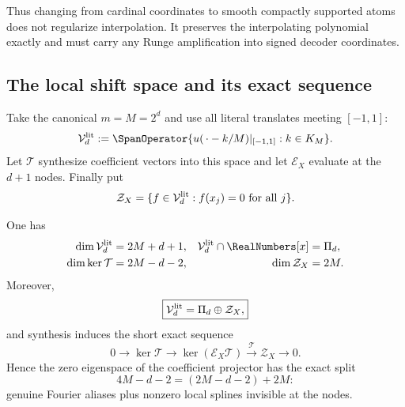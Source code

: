 Thus changing from cardinal coordinates to smooth compactly supported atoms
does not regularize interpolation.  It preserves the interpolating
polynomial exactly and must carry any Runge amplification into signed decoder
coordinates.

\subsection{The local shift space and its exact sequence}

Take the canonical $m=M=2^d$ and use all literal translates meeting
$[-1,1]$:
\[
 \mathcal V_d^{\rm lit}
 :=\SpanOperator\{u(\,\cdot-k/M)|_{[-1,1]}:k\in K_M\}.
\]
Let $\mathcal T$ synthesize coefficient vectors into this space and let
$\mathcal E_X$ evaluate at the $d+1$ nodes.  Finally put
\[
 \mathcal Z_X=\{f\in\mathcal V_d^{\rm lit}:f(x_j)=0\text{ for all }j\}.
\]

\begin{theorem}
\label{thm:lag-exact-sequence}
One has
\begin{align}
 \dim\mathcal V_d^{\rm lit}&=2M+d+1,
 &\mathcal V_d^{\rm lit}\cap\RealNumbers[x]&=\PiD,
 \label{eq:lag-lit-dimension}\\
 \dim\ker\mathcal T&=2M-d-2,
 &\dim\mathcal Z_X&=2M.
 \label{eq:lag-kernel-dimensions}
\end{align}
Moreover,
\begin{equation}
 \boxed{
 \mathcal V_d^{\rm lit}=\Pi_d\oplus\mathcal Z_X,}
 \label{eq:lag-direct-sum}
\end{equation}
and synthesis induces the short exact sequence
\begin{equation}
 0\longrightarrow\ker\mathcal T
 \longrightarrow\ker(\mathcal E_X\mathcal T)
 \xrightarrow{\ \mathcal T\ }\mathcal Z_X
 \longrightarrow0.
 \label{eq:lag-exact-sequence}
\end{equation}
Hence the zero eigenspace of the coefficient projector has the exact split
\begin{equation}
 4M-d-2=(2M-d-2)+2M:
 \label{eq:lag-zero-split}
\end{equation}
genuine Fourier aliases plus nonzero local splines invisible at the nodes.
\end{theorem}

